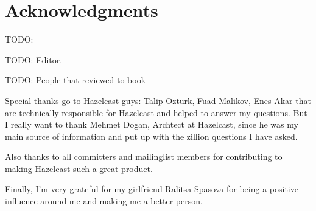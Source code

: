 \chapter*{Acknowledgments}

TODO: 

TODO: Editor.

TODO: People that reviewed to book

Special thanks go to Hazelcast guys: Talip Ozturk, Fuad Malikov, Enes Akar that are technically responsible for Hazelcast and helped to answer my questions. But I really want to thank Mehmet Dogan, Archtect at Hazelcast, since he was my main source of information and put up with the zillion questions I have asked.

Also thanks to all committers and mailinglist members for contributing to making Hazelcast such a great product.

Finally, I'm very grateful for my girlfriend Ralitsa Spasova for being a positive influence around me and making me a better person.

